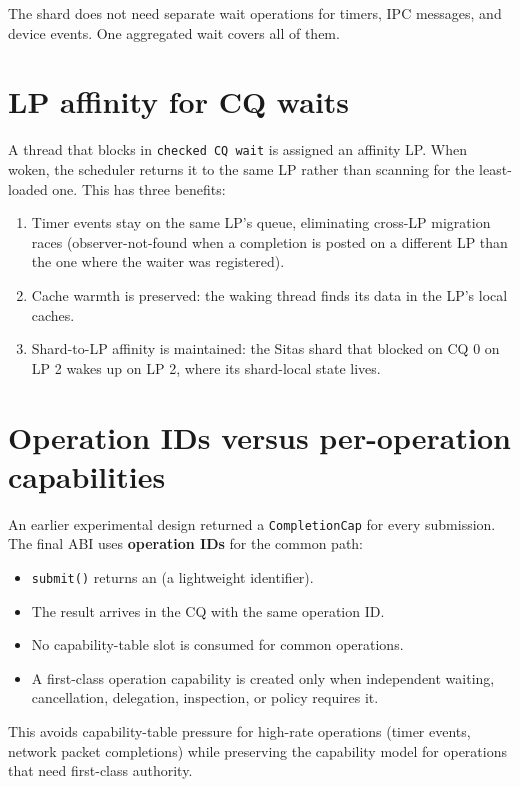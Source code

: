 The shard does not need separate wait operations for timers, IPC messages, and
device events. One aggregated wait covers all of them.

\section{LP affinity for CQ waits}

A thread that blocks in \texttt{checked CQ wait} is assigned an affinity LP. When woken,
the scheduler returns it to the same LP rather than scanning for the least-loaded
one. This has three benefits:

\begin{enumerate}
    \item Timer events stay on the same LP's queue, eliminating
        cross-LP migration races (observer-not-found when a completion is posted
        on a different LP than the one where the waiter was registered).
    \item Cache warmth is preserved: the waking thread finds its data
        in the LP's local caches.
    \item Shard-to-LP affinity is maintained: the Sitas shard that blocked
        on CQ 0 on LP 2 wakes up on LP 2, where its shard-local state lives.
\end{enumerate}

\section{Operation IDs versus per-operation capabilities}

An earlier experimental design returned a \texttt{CompletionCap} for every
submission. The final ABI uses \textbf{operation IDs} for the common path:

\begin{itemize}
    \item \texttt{submit()} returns an  (a lightweight
        identifier).
    \item The result arrives in the CQ with the same operation ID.
    \item No capability-table slot is consumed for common operations.
    \item A first-class operation capability is created only when independent
        waiting, cancellation, delegation, inspection, or policy requires it.
\end{itemize}

This avoids capability-table pressure for high-rate operations (timer events,
network packet completions) while preserving the capability model for operations
that need first-class authority.

